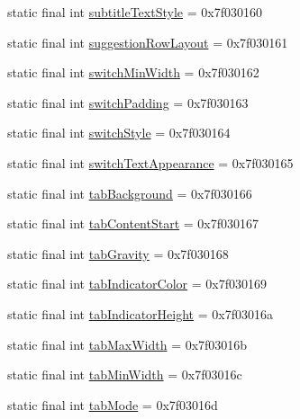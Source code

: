 \begin{DoxyCompactItemize}
static final int \mbox{\hyperlink{classandroid_1_1support_1_1design_1_1_r_1_1attr_a75b165e034b7316ce6c972f6498f101e}{subtitle\+Text\+Style}} = 0x7f030160
\item 
static final int \mbox{\hyperlink{classandroid_1_1support_1_1design_1_1_r_1_1attr_a7918790cb5a25e1270e1bf43a16cc2a0}{suggestion\+Row\+Layout}} = 0x7f030161
\item 
static final int \mbox{\hyperlink{classandroid_1_1support_1_1design_1_1_r_1_1attr_a1c4c95bc20c66b6bbb0a5e8aa9017ce5}{switch\+Min\+Width}} = 0x7f030162
\item 
static final int \mbox{\hyperlink{classandroid_1_1support_1_1design_1_1_r_1_1attr_a50d44cc963c1f7a6300e08d870c28bad}{switch\+Padding}} = 0x7f030163
\item 
static final int \mbox{\hyperlink{classandroid_1_1support_1_1design_1_1_r_1_1attr_aefa144eea4f788e6b7043203c6527b8a}{switch\+Style}} = 0x7f030164
\item 
static final int \mbox{\hyperlink{classandroid_1_1support_1_1design_1_1_r_1_1attr_a57b7729473f85f18c278bdab4e618366}{switch\+Text\+Appearance}} = 0x7f030165
\item 
static final int \mbox{\hyperlink{classandroid_1_1support_1_1design_1_1_r_1_1attr_a655d14e3167b8f64ef0f47b57e34cdc5}{tab\+Background}} = 0x7f030166
\item 
static final int \mbox{\hyperlink{classandroid_1_1support_1_1design_1_1_r_1_1attr_a95a1e6a938c369ab1d4432cc581d5ee4}{tab\+Content\+Start}} = 0x7f030167
\item 
static final int \mbox{\hyperlink{classandroid_1_1support_1_1design_1_1_r_1_1attr_a63623768932b683ba92fe1ee1a153e37}{tab\+Gravity}} = 0x7f030168
\item 
static final int \mbox{\hyperlink{classandroid_1_1support_1_1design_1_1_r_1_1attr_a0b95949e8c3665fe8dc7a51fc7a2e72c}{tab\+Indicator\+Color}} = 0x7f030169
\item 
static final int \mbox{\hyperlink{classandroid_1_1support_1_1design_1_1_r_1_1attr_a5c362741ab5aebe6a031d68b443ee3a9}{tab\+Indicator\+Height}} = 0x7f03016a
\item 
static final int \mbox{\hyperlink{classandroid_1_1support_1_1design_1_1_r_1_1attr_a43a4d96667624eaf72c716ba0579e3cb}{tab\+Max\+Width}} = 0x7f03016b
\item 
static final int \mbox{\hyperlink{classandroid_1_1support_1_1design_1_1_r_1_1attr_ad05647ddee10bb7cb00acd5d0255c461}{tab\+Min\+Width}} = 0x7f03016c
\item 
static final int \mbox{\hyperlink{classandroid_1_1support_1_1design_1_1_r_1_1attr_a6471efddc2adcbd6b7dd9951067fce93}{tab\+Mode}} = 0x7f03016d

\end{DoxyCompactItemize}
